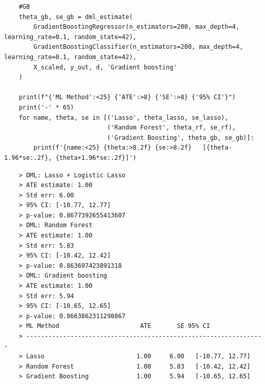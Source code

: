 \documentclass[10pt]{article}
\begin{document}
\begin{lstlisting}
    #GB
    theta_gb, se_gb = dml_estimate(
        GradientBoostingRegressor(n_estimators=200, max_depth=4, learning_rate=0.1, random_state=42),
        GradientBoostingClassifier(n_estimators=200, max_depth=4, learning_rate=0.1, random_state=42),
        X_scaled, y_out, d, 'Gradient boosting'
    )

    print(f"{'ML Method':<25} {'ATE':>8} {'SE':>8} {'95% CI'}")
    print('-' * 65)
    for name, theta, se in [('Lasso', theta_lasso, se_lasso), 
                            ('Random Forest', theta_rf, se_rf),
                            ('Gradient Boosting', theta_gb, se_gb)]:
        print(f'{name:<25} {theta:>8.2f} {se:>8.2f}   [{theta-1.96*se:.2f}, {theta+1.96*se:.2f}]')
\end{lstlisting}
\begin{verbatim}
    > DML: Lasso + Logistic Lasso
    > ATE estimate: 1.00
    > Std err: 6.00
    > 95% CI: [-10.77, 12.77]
    > p-value: 0.8677392655413607
    > DML: Random Forest
    > ATE estimate: 1.00
    > Std err: 5.83
    > 95% CI: [-10.42, 12.42]
    > p-value: 0.863697423891318
    > DML: Gradient boosting
    > ATE estimate: 1.00
    > Std err: 5.94
    > 95% CI: [-10.65, 12.65]
    > p-value: 0.8663862311298867
    > ML Method                      ATE       SE 95% CI
    > -----------------------------------------------------------------
    > Lasso                         1.00     6.00   [-10.77, 12.77]
    > Random Forest                 1.00     5.83   [-10.42, 12.42]
    > Gradient Boosting             1.00     5.94   [-10.65, 12.65]
\end{verbatim}
\end{document}
